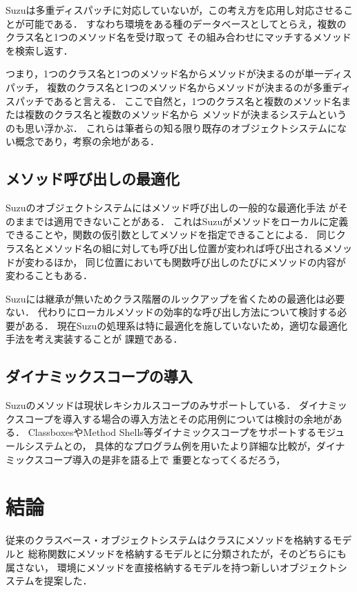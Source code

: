 \documentclass{ipsjprosym}
\begin{document}
Suzuは多重ディスパッチに対応していないが，この考え方を応用し対応させることが可能である．
すなわち環境をある種のデータベースとしてとらえ，複数のクラス名と1つのメソッド名を受け取って
その組み合わせにマッチするメソッドを検索し返す．

つまり，1つのクラス名と1つのメソッド名からメソッドが決まるのが単一ディスパッチ，
複数のクラス名と1つのメソッド名からメソッドが決まるのが多重ディスパッチであると言える．
ここで自然と，1つのクラス名と複数のメソッド名または複数のクラス名と複数のメソッド名から
メソッドが決まるシステムというのも思い浮かぶ．
これらは筆者らの知る限り既存のオブジェクトシステムにない概念であり，考察の余地がある．

\subsection{メソッド呼び出しの最適化}

Suzuのオブジェクトシステムにはメソッド呼び出しの一般的な最適化手法\cite{Onodera:1997-04-15}
がそのままでは適用できないことがある．
これはSuzuがメソッドをローカルに定義できることや，関数の仮引数としてメソッドを指定できることによる．
同じクラス名とメソッド名の組に対しても呼び出し位置が変われば呼び出されるメソッドが変わるほか，
同じ位置においても関数呼び出しのたびにメソッドの内容が変わることもある．

Suzuには継承が無いためクラス階層のルックアップを省くための最適化は必要ない．
代わりにローカルメソッドの効率的な呼び出し方法について検討する必要がある．
現在Suzuの処理系は特に最適化を施していないため，適切な最適化手法を考え実装することが
課題である．

\subsection{ダイナミックスコープの導入}

Suzuのメソッドは現状レキシカルスコープのみサポートしている．
ダイナミックスコープを導入する場合の導入方法とその応用例については検討の余地がある．
ClassboxesやMethod Shells等ダイナミックスコープをサポートするモジュールシステムとの，
具体的なプログラム例を用いたより詳細な比較が，ダイナミックスコープ導入の是非を語る上で
重要となってくるだろう，

\section{結論}

従来のクラスベース・オブジェクトシステムはクラスにメソッドを格納するモデルと
総称関数にメソッドを格納するモデルとに分類されたが，そのどちらにも属さない，
環境にメソッドを直接格納するモデルを持つ新しいオブジェクトシステムを提案した．
\end{document}

